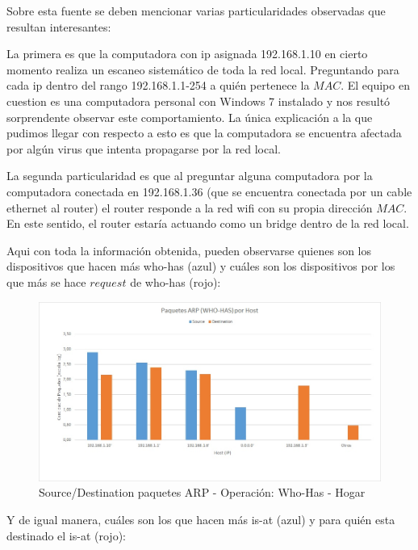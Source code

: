 Sobre esta fuente se deben mencionar varias particularidades observadas que resultan interesantes:

La primera es que la computadora con ip asignada 192.168.1.10 en cierto momento realiza un escaneo sistemático de toda la red local. Preguntando para cada ip dentro del rango 192.168.1.1-254 a quién pertenece la $MAC$. El equipo en cuestion es una computadora personal con Windows 7 instalado y nos resultó sorprendente observar este comportamiento. La única explicación a la que pudimos llegar con respecto a esto es que la computadora se encuentra afectada por algún virus que intenta propagarse por la red local.

La segunda particularidad es que al preguntar alguna computadora por la computadora conectada en 192.168.1.36 (que se encuentra conectada por un cable ethernet al router) el router responde a la red wifi con su propia dirección $MAC$. En este sentido, el router estaría actuando como un bridge dentro de la red local.

Aqui con toda la información obtenida, pueden observarse quienes son los dispositivos que hacen más who-has (azul) y cuáles son los dispositivos por los que más se hace $request$ de who-has (rojo):

\newpage

\begin{figure}[h!]
\centering
\includegraphics[scale=0.5]{./img/arp_whoHas_casa.jpg}
\caption{Source/Destination paquetes ARP - Operación: Who-Has - Hogar}
\end{figure}

Y de igual manera, cuáles son los que hacen más is-at (azul) y para quién esta destinado el is-at (rojo):

